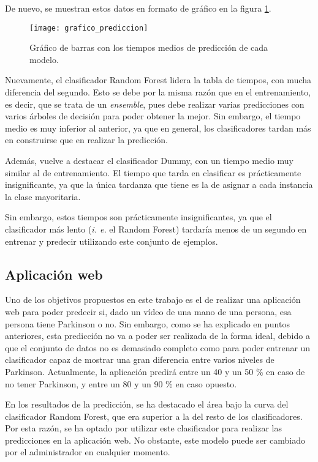 De nuevo, se muestran estos datos en formato de gráfico en la figura \ref{fig:grafico_prediccion}.
 
\begin{figure}[ht]
 	\texttt{[image: grafico\_prediccion]}
 	\caption{Gráfico de barras con los tiempos medios de predicción de cada modelo.}
 	\label{fig:grafico_prediccion}
\end{figure}
 
 Nuevamente, el clasificador Random Forest lidera la tabla de tiempos, con mucha diferencia del segundo. Esto se debe por la misma razón que en el entrenamiento, es decir, que se trata de un \textit{ensemble}, pues debe realizar varias predicciones con varios árboles de decisión para poder obtener la mejor. Sin embargo, el tiempo medio es muy inferior al anterior, ya que en general, los clasificadores tardan más en construirse que en realizar la predicción. 
 
 Además, vuelve a destacar el clasificador Dummy, con un tiempo medio muy similar al de entrenamiento. El tiempo que tarda en clasificar es prácticamente insignificante, ya que la única tardanza que tiene es la de asignar a cada instancia la clase mayoritaria.
 
 Sin embargo, estos tiempos son prácticamente insignificantes, ya que el clasificador más lento (\textit{i. e.} el Random Forest) tardaría menos de un segundo en entrenar y predecir utilizando este conjunto de ejemplos.
 
 \subsection{Aplicación web}
Uno de los objetivos propuestos en este trabajo es el de realizar una aplicación web para poder predecir si, dado un vídeo de una mano de una persona, esa persona tiene Parkinson o no. Sin embargo, como se ha explicado en puntos anteriores, esta predicción no va a poder ser realizada de la forma ideal, debido a que el conjunto de datos no es demasiado completo como para poder entrenar un clasificador capaz de mostrar una gran diferencia  entre varios niveles de Parkinson. Actualmente, la aplicación predirá entre un 40 y un 50 \% en caso de no tener Parkinson, y entre un 80 y un 90 \% en caso opuesto.

En los resultados de la predicción, se ha destacado el área bajo la curva del clasificador Random Forest, que era superior a la del resto de los clasificadores. Por esta razón, se ha optado por utilizar este clasificador para realizar las predicciones en la aplicación web. No obstante, este modelo puede ser cambiado por el administrador en cualquier momento.


